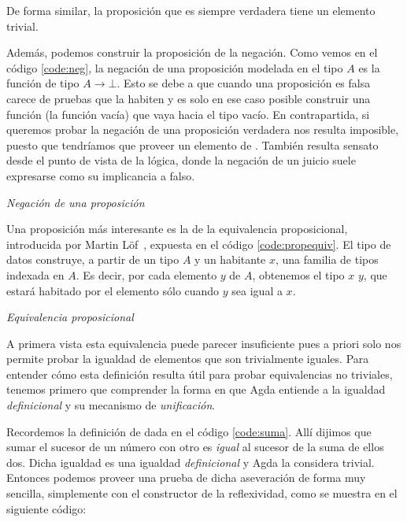 De forma similar, la proposición que es siempre verdadera tiene un elemento trivial.


Además, podemos construir la proposición de la negación. Como vemos en el código \ref{code:neg}, la negación de una proposición modelada en el tipo $A$ es la función de tipo $A \to \bot$. Esto se debe a que cuando una proposición es falsa carece de pruebas que la habiten y es solo en ese caso posible construir una función (la función vacía) que vaya hacia el tipo vacío. En contrapartida, si queremos probar la negación de una proposición verdadera nos resulta imposible, puesto que tendríamos que proveer un elemento de \AgdaDatatype{$\bot$}. También resulta sensato desde el punto de vista de la lógica, donde la negación de un juicio suele expresarse como su implicancia a falso. 

\begin{agdacode}{\it Negación de una proposición} \label{code:neg}

\end{agdacode}


Una proposición más interesante es la de la equivalencia proposicional, introducida por Martin Löf~\cite{Martin-Lof-1972,Martin-Lof-1973}, expuesta en el código \ref{code:propequiv}.
El tipo de datos \AgdaDatatype{$\_\equiv\_$} construye, a partir de un tipo $A$ y un habitante $x$, una familia de tipos indexada en $A$. Es decir, por cada elemento $y$ de $A$, obtenemos el tipo $x$ \AgdaDatatype{$\equiv$} $y$, que estará habitado por el elemento  sólo cuando $y$ sea igual a $x$. 

\begin{agdacode}{\it Equivalencia proposicional} \label{code:propequiv}

\end{agdacode}

A primera vista esta equivalencia puede parecer insuficiente pues a priori solo nos permite probar la igualdad de elementos que son trivialmente iguales. Para entender cómo esta definición resulta útil para probar equivalencias no triviales, tenemos primero que comprender la forma en que Agda entiende a la igualdad {\it definicional} y su mecanismo de {\it unificación}.   

Recordemos la definición de  dada en el código \ref{code:suma}. Allí dijimos que sumar el sucesor de un número con otro es {\it igual} al sucesor de la suma de ellos dos. Dicha igualdad es una igualdad {\it definicional} y Agda la considera trivial. Entonces podemos proveer una prueba de dicha aseveración de forma muy sencilla, simplemente con el constructor de la reflexividad, como se muestra en el siguiente código:

